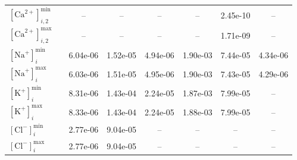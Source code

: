 \begin{table}[t]
\begin{tabular}{l l S S S S S S}
$[\mathrm{Ca}^{2+}]_{i,2}^{\min}$ & & {--} & {--} & {--} & {--} & 2.45e-10 & {--} \\
$[\mathrm{Ca}^{2+}]_{i,2}^{\max}$ & & {--} & {--} & {--} & {--} & 1.71e-09 & {--} \\
$[\mathrm{Na}^{+}]_{i}^{\min}$ & & 6.04e-06 & 1.52e-05 & 4.94e-06 & 1.90e-03 & 7.44e-05 & 4.34e-06 \\
$[\mathrm{Na}^{+}]_{i}^{\max}$ & & 6.03e-06 & 1.51e-05 & 4.95e-06 & 1.90e-03 & 7.43e-05 & 4.29e-06 \\
$[\mathrm{K}^{+}]_{i}^{\min}$ & & 8.31e-06 & 1.43e-04 & 2.24e-05 & 1.87e-03 & 7.99e-05 & {--} \\
$[\mathrm{K}^{+}]_{i}^{\max}$ & & 8.33e-06 & 1.43e-04 & 2.24e-05 & 1.88e-03 & 7.99e-05 & {--} \\
$[\mathrm{Cl}^{-}]_{i}^{\min}$ & & 2.77e-06 & 9.04e-05 & {--} & {--} & {--} & {--} \\
$[\mathrm{Cl}^{-}]_{i}^{\max}$ & & 2.77e-06 & 9.04e-05 & {--} & {--} & {--} & {--} \\
\bottomrule
\end{tabular}
\end{table}
